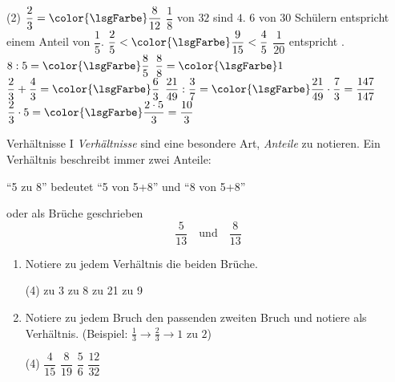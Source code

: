 \documentclass[12pt,a5paper,landscape]{scrartcl}
\def\clrLsg{\color{\lsgFarbe}}
\begin{document}
	\begin{loesungskarte}
		\begin{tasks}(2)
			\task $\dfrac{2}{3} = \clrLsg\dfrac{8}{12}$
			\task $\dfrac{1}{8}$ von $32$ sind \clrLsg$4$.
			\task $6$ von $30$ Schülern entspricht einem Anteil von \clrLsg$\dfrac{1}{5}$.
			\task $\dfrac{2}{5} < \clrLsg\dfrac{9}{15} < \dfrac{4}{5}$
			\task $\dfrac{1}{20}$ entspricht \clrLsg{}.
			\task $8: 5 =\clrLsg\dfrac{8}{5}$
			\task $\dfrac{8}{8} = \clrLsg 1$
			\task $\dfrac{2}{3} + \dfrac{4}{3} = \clrLsg\dfrac{6}{3}$
			\task $\dfrac{21}{49}: \dfrac{3}{7} = \clrLsg\dfrac{21}{49}\cdot \dfrac{7}{3} = \dfrac{147}{147}$
			\task $\dfrac{2}{3}\cdot 5 = \clrLsg\dfrac{2\cdot 5}{3} = \dfrac{10}{3}$
		\end{tasks}
	\end{loesungskarte}
	
	\begin{karte1}{Verhältnisse I}
		\emph{Verhältnisse} sind eine besondere Art, \emph{Anteile} zu notieren. Ein Verhältnis beschreibt immer zwei Anteile:
		\begin{center}
			\enquote{5 zu 8} bedeutet \enquote{5 von 5+8} und \enquote{8 von 5+8}
		\end{center}
		oder als Brüche geschrieben
		\[ \frac{5}{13} \quad\text{und}\quad \frac{8}{13} \]
		
		\begin{enumerate}
			\item Notiere zu jedem Verhältnis die beiden Brüche.
				\begin{tasks}(4)
					\task 7 zu 3
					\task 4 zu 8
					\task 14 zu 21
					\task 13 zu 9
				\end{tasks}
			
			\item Notiere zu jedem Bruch den passenden zweiten Bruch und notiere als Verhältnis. (Beispiel: $\tfrac{1}{3} \rightarrow \tfrac{2}{3} \rightarrow \text{1 zu 2}$)
				\begin{tasks}(4)
					\task $\dfrac{4}{15}$
					\task $\dfrac{8}{19}$
					\task $\dfrac{5}{6}$
					\task $\dfrac{12}{32}$
				\end{tasks}
		\end{enumerate}
	\end{karte1}
	
\end{document}
